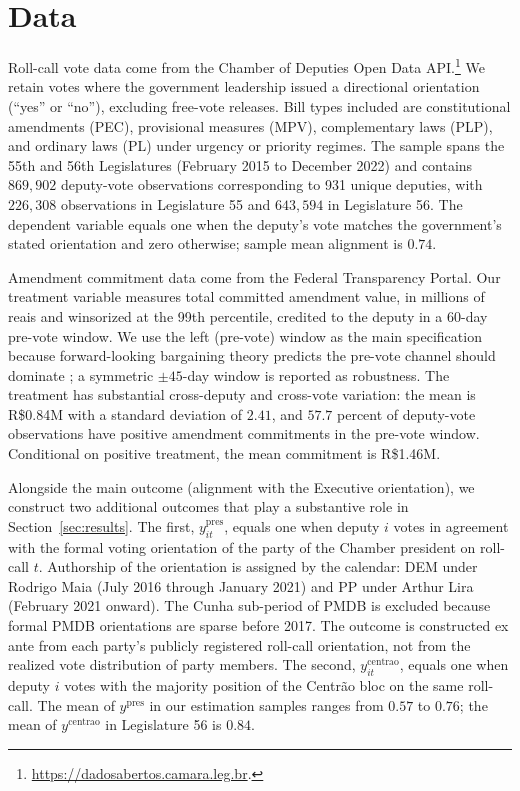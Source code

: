 \documentclass[pdflatex,sn-basic]{sn-jnl}
\begin{document}
\section{Data}
\label{sec:data}

Roll-call vote data come from the Chamber of Deputies Open Data API.\footnote{\url{https://dadosabertos.camara.leg.br}.} We retain votes where the government leadership issued a directional orientation (``yes'' or ``no''), excluding free-vote releases. Bill types included are constitutional amendments (PEC), provisional measures (MPV), complementary laws (PLP), and ordinary laws (PL) under urgency or priority regimes. The sample spans the 55th and 56th Legislatures (February 2015 to December 2022) and contains $869{,}902$ deputy-vote observations corresponding to 931 unique deputies, with $226{,}308$ observations in Legislature 55 and $643{,}594$ in Legislature 56. The dependent variable equals one when the deputy's vote matches the government's stated orientation and zero otherwise; sample mean alignment is $0.74$.

Amendment commitment data come from the Federal Transparency Portal. Our treatment variable measures total committed amendment value, in millions of reais and winsorized at the 99th percentile, credited to the deputy in a 60-day pre-vote window. We use the left (pre-vote) window as the main specification because forward-looking bargaining theory predicts the pre-vote channel should dominate \citep{Raile2011}; a symmetric $\pm 45$-day window is reported as robustness. The treatment has substantial cross-deputy and cross-vote variation: the mean is R\$0.84M with a standard deviation of $2.41$, and $57.7$ percent of deputy-vote observations have positive amendment commitments in the pre-vote window. Conditional on positive treatment, the mean commitment is R\$1.46M.

Alongside the main outcome (alignment with the Executive orientation), we construct two additional outcomes that play a substantive role in Section~\ref{sec:results}. The first, $y^{\mathrm{pres}}_{it}$, equals one when deputy $i$ votes in agreement with the formal voting orientation of the party of the Chamber president on roll-call $t$. Authorship of the orientation is assigned by the calendar: DEM under Rodrigo Maia (July 2016 through January 2021) and PP under Arthur Lira (February 2021 onward). The Cunha sub-period of PMDB is excluded because formal PMDB orientations are sparse before 2017. The outcome is constructed ex ante from each party's publicly registered roll-call orientation, not from the realized vote distribution of party members. The second, $y^{\mathrm{centrao}}_{it}$, equals one when deputy $i$ votes with the majority position of the Centr\~ao bloc on the same roll-call. The mean of $y^{\mathrm{pres}}$ in our estimation samples ranges from $0.57$ to $0.76$; the mean of $y^{\mathrm{centrao}}$ in Legislature 56 is $0.84$.
\end{document}
